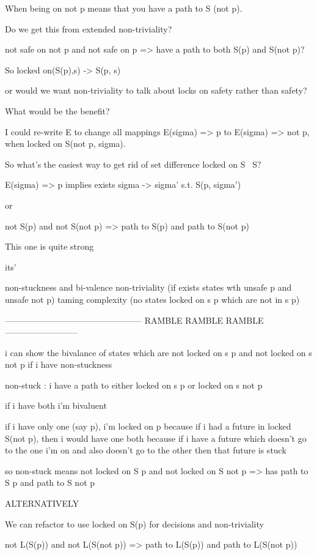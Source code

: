 \documentclass{article}
\theoremstyle{definition}
\begin{document}
When being on not p means that you have a path to S (not p).

Do we get this from extended non-triviality?

not safe on not p and not safe on p => have a path to both S(p) and S(not p)?

So locked on(S(p),s) -> S(p, s)

or would we want non-triviality to talk about locks on safety rather than safety?

What would be the benefit?

I could re-write E to change all mappings E(sigma) => p to E(sigma) => not p, when locked on S(not p, sigma).

So what's the easiest way to get rid of set difference locked on S \ S?

E(sigma) => p implies exists sigma -> sigma' s.t. S(p, sigma')

or

not S(p) and not S(not p) => path to S(p) and path to S(not p)

This one is quite strong 

its' 

non-stuckness and bi-valence
non-triviality (if exists states wth unsafe p and unsafe not p)
taming complexity (no states locked on s p which are not in s p)

------------------------------------------------ RAMBLE RAMBLE RAMBLE --------------------------

i can show the bivalance of states which are not locked on s p and not locked on s not p if i have non-stuckness


non-stuck : i have a path to either locked on s p or locked on s not p

if i have both i'm bivaluent

if i have only one (say p), i'm locked on p
  because if i had a future in locked S(not p), then i would have one both
  because if i have a future which doesn't go to the one i'm on and also doesn't go to the other
  then that future is stuck


so non-stuck means not locked on S p and not locked on S not p => has path to S p and path to S not p





ALTERNATIVELY



We can refactor to use locked on S(p) for decisions and non-triviality

not L(S(p)) and not L(S(not p)) => path to L(S(p)) and path to L(S(not p))
\end{document}
